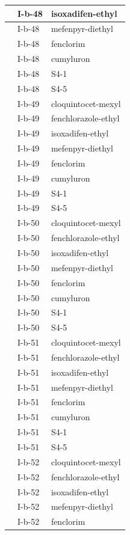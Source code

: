 \documentclass[11pt,a4paper]{article}
\begin{document}
\begin{table}[h]
\begin{tabular}{|l|l|l|}
 & I-b-48 & isoxadifen-ethyl \\ \hline
 & I-b-48 & mefenpyr-diethyl \\ \hline
 & I-b-48 & fenclorim \\ \hline
 & I-b-48 & cumyluron \\ \hline
 & I-b-48 & S4-1 \\ \hline
 & I-b-48 & S4-5 \\ \hline
 & I-b-49 & cloquintocet-mexyl \\ \hline
 & I-b-49 & fenchlorazole-ethyl \\ \hline
 & I-b-49 & isoxadifen-ethyl \\ \hline
 & I-b-49 & mefenpyr-diethyl \\ \hline
 & I-b-49 & fenclorim \\ \hline
 & I-b-49 & cumyluron \\ \hline
 & I-b-49 & S4-1 \\ \hline
 & I-b-49 & S4-5 \\ \hline
 & I-b-50 & cloquintocet-mexyl \\ \hline
 & I-b-50 & fenchlorazole-ethyl \\ \hline
 & I-b-50 & isoxadifen-ethyl \\ \hline
 & I-b-50 & mefenpyr-diethyl \\ \hline
 & I-b-50 & fenclorim \\ \hline
 & I-b-50 & cumyluron \\ \hline
 & I-b-50 & S4-1 \\ \hline
 & I-b-50 & S4-5 \\ \hline
 & I-b-51 & cloquintocet-mexyl \\ \hline
 & I-b-51 & fenchlorazole-ethyl \\ \hline
 & I-b-51 & isoxadifen-ethyl \\ \hline
 & I-b-51 & mefenpyr-diethyl \\ \hline
 & I-b-51 & fenclorim \\ \hline
 & I-b-51 & cumyluron \\ \hline
 & I-b-51 & S4-1 \\ \hline
 & I-b-51 & S4-5 \\ \hline
 & I-b-52 & cloquintocet-mexyl \\ \hline
 & I-b-52 & fenchlorazole-ethyl \\ \hline
 & I-b-52 & isoxadifen-ethyl \\ \hline
 & I-b-52 & mefenpyr-diethyl \\ \hline
 & I-b-52 & fenclorim \\ \hline

\end{tabular}
\end{table}
\end{document}
